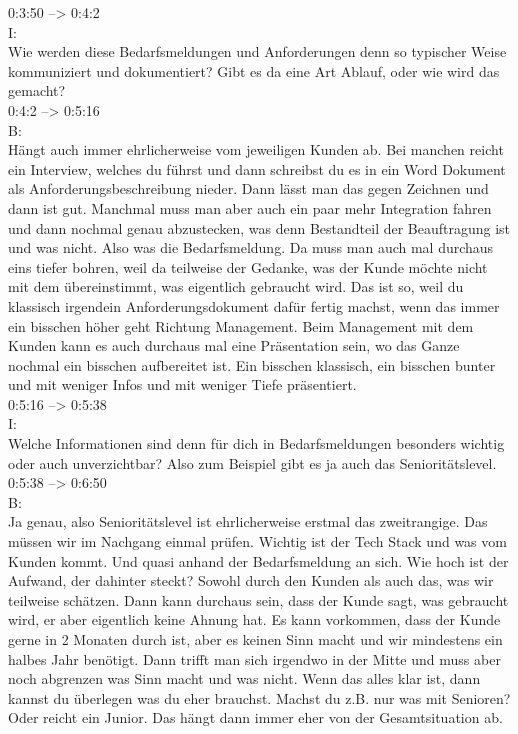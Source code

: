 0:3:50 --> 0:4:2\\
I:\\
Wie werden diese Bedarfsmeldungen und Anforderungen denn so typischer Weise kommuniziert und dokumentiert? Gibt es da eine Art Ablauf, oder wie wird das gemacht?\\

0:4:2 --> 0:5:16\\
B:\\
Hängt auch immer ehrlicherweise vom jeweiligen Kunden ab. Bei manchen reicht ein Interview, welches du führst und dann schreibst du es in ein Word Dokument als Anforderungsbeschreibung nieder. Dann lässt man das gegen Zeichnen und dann ist gut. Manchmal muss man aber auch ein paar mehr Integration fahren und dann nochmal genau abzustecken, was denn Bestandteil der Beauftragung ist und was nicht. Also was die Bedarfsmeldung. Da muss man auch mal durchaus eins tiefer bohren, weil da teilweise der Gedanke, was der Kunde möchte nicht mit dem übereinstimmt, was eigentlich gebraucht wird. Das ist so, weil du klassisch irgendein Anforderungsdokument dafür fertig machst, wenn das immer ein bisschen höher geht Richtung Management. Beim Management mit dem Kunden kann es auch durchaus mal eine Präsentation sein, wo das Ganze nochmal ein bisschen aufbereitet ist. Ein bisschen klassisch, ein bisschen bunter und mit weniger Infos und mit weniger Tiefe präsentiert.\\

0:5:16 --> 0:5:38\\
I:\\
Welche Informationen sind denn für dich in Bedarfsmeldungen besonders wichtig oder auch unverzichtbar? Also zum Beispiel gibt es ja auch das Senioritätslevel.\\

0:5:38 --> 0:6:50\\
B:\\
Ja genau, also Senioritätslevel ist ehrlicherweise erstmal das zweitrangige. Das müssen wir im Nachgang einmal prüfen. Wichtig ist der Tech Stack und was vom Kunden kommt. Und quasi anhand der Bedarfsmeldung an sich. Wie hoch ist der Aufwand, der dahinter steckt? Sowohl durch den Kunden als auch das, was wir teilweise schätzen. Dann kann durchaus sein, dass der Kunde sagt, was gebraucht wird, er aber eigentlich keine Ahnung hat. Es kann vorkommen, dass der Kunde gerne in 2 Monaten durch ist, aber es keinen Sinn macht und wir mindestens ein halbes Jahr benötigt. Dann trifft man sich irgendwo in der Mitte und muss aber noch abgrenzen was Sinn macht und was nicht. Wenn das alles klar ist, dann kannst du überlegen was du eher brauchst. Machst du z.B. nur was mit Senioren? Oder reicht ein Junior. Das hängt dann immer eher von der Gesamtsituation ab.\\

